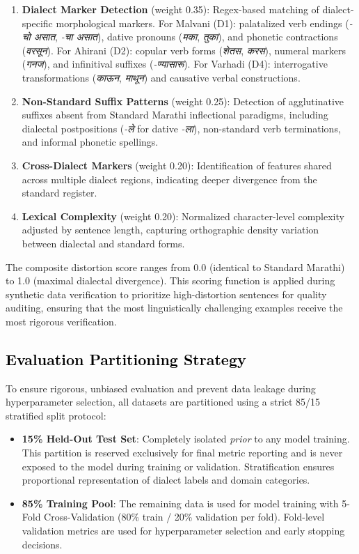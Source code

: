 \begin{enumerate}
    \item \textbf{Dialect Marker Detection} (weight 0.35): Regex-based matching of dialect-specific morphological markers. For Malvani (D1): palatalized verb endings (\emph{-चो असात}, \emph{-चा असात}), dative pronouns (\emph{मका}, \emph{तुका}), and phonetic contractions (\emph{वरसून}). For Ahirani (D2): copular verb forms (\emph{शेतस}, \emph{करस}), numeral markers (\emph{गनज}), and infinitival suffixes (\emph{-ण्यासारू}). For Varhadi (D4): interrogative transformations (\emph{काऊन}, \emph{माथून}) and causative verbal constructions.
    \item \textbf{Non-Standard Suffix Patterns} (weight 0.25): Detection of agglutinative suffixes absent from Standard Marathi inflectional paradigms, including dialectal postpositions (\emph{-ले} for dative \emph{-ला}), non-standard verb terminations, and informal phonetic spellings.
    \item \textbf{Cross-Dialect Markers} (weight 0.20): Identification of features shared across multiple dialect regions, indicating deeper divergence from the standard register.
    \item \textbf{Lexical Complexity} (weight 0.20): Normalized character-level complexity adjusted by sentence length, capturing orthographic density variation between dialectal and standard forms.
\end{enumerate}

The composite distortion score ranges from 0.0 (identical to Standard Marathi) to 1.0 (maximal dialectal divergence). This scoring function is applied during synthetic data verification to prioritize high-distortion sentences for quality auditing, ensuring that the most linguistically challenging examples receive the most rigorous verification.

\subsection{\textcolor{black}{Evaluation Partitioning Strategy}}

To ensure rigorous, unbiased evaluation and prevent data leakage during hyperparameter selection, all datasets are partitioned using a strict 85/15 stratified split protocol:

\begin{itemize}
    \item \textbf{15\% Held-Out Test Set}: Completely isolated \textit{prior} to any model training. This partition is reserved exclusively for final metric reporting and is never exposed to the model during training or validation. Stratification ensures proportional representation of dialect labels and domain categories.
    \item \textbf{85\% Training Pool}: The remaining data is used for model training with 5-Fold Cross-Validation (80\% train / 20\% validation per fold). Fold-level validation metrics are used for hyperparameter selection and early stopping decisions.
\end{itemize}

